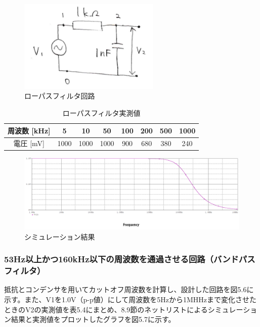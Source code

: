\documentclass{jlreq}
\numberwithin{equation}{section}
\begin{document}
\begin{figure}[H]
  \centering
  \includegraphics[width=0.6\textwidth]{assets/lowpasskairo.png}
  \caption{ローパスフィルタ回路}
\end{figure}

\begin{table}[H]
  \centering
  \caption{ローパスフィルタ実測値}
  \begin{tabular}{|c|c|c|c|c|c|c|c|}
    \hline
    周波数 [kHz] & 5 & 10 & 50 & 100 & 200 & 500 & 1000 \\ \hline
    電圧 [mV] & 1000 & 1000 & 1000 & 900 & 680 & 380 & 240 \\ \hline
  \end{tabular}
\end{table}

\begin{figure}[H]
  \centering
  \includegraphics[width=\textwidth]{assets/lowpass.png}
  \caption{シミュレーション結果}
\end{figure}

\subsubsection{53Hz以上かつ160kHz以下の周波数を通過させる回路（バンドパスフィルタ）}
抵抗とコンデンサを用いてカットオフ周波数を計算し、設計した回路を図5.6に示す。また、V1を1.0V（p-p値）にして周波数を5Hzから1MHHzまで変化させたときのV2の実測値を表5.4にまとめ、8.9節のネットリストによるシミュレーション結果と実測値をプロットしたグラフを図5.7に示す。
\end{document}
